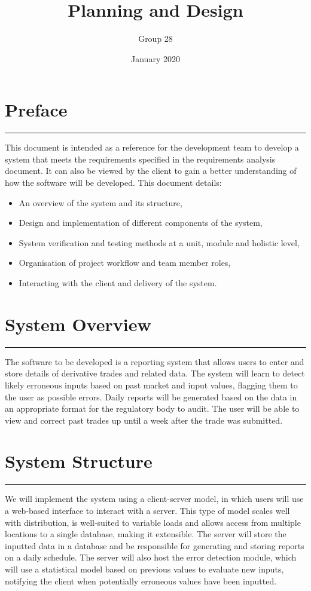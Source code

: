 \documentclass{article}
\title{Planning and Design}
\author{Group 28}
\date{January 2020}
\begin{document}
\maketitle

\section*{Preface}
\hrule
\vspace{9pt}

\noindent This document is intended as a reference for the development team to develop a system that meets the requirements specified in the requirements analysis document.  It can also be viewed by the client to gain a better understanding of how the software will be developed. This document details: 
\begin{itemize}
    \item An overview of the system and its structure,
    \item Design and implementation of different components of the system,
    \item System verification and testing methods at a unit, module and holistic level,
    \item Organisation of project workflow and team member roles,
    \item Interacting with the client and delivery of the system. 
\end{itemize}


\section*{System Overview}
\hrule
\vspace{9pt}
The software to be developed is a reporting system that allows users to enter and store details of derivative trades and related data. The system will learn to detect likely erroneous inputs based on past market and input values, flagging them to the user as possible errors. Daily reports will be generated based on the data in an appropriate format for the regulatory body to audit. The user will be able to view and correct past trades up until a week after the trade was submitted.

\section*{System Structure}
\hrule
\vspace{9pt}
We will implement the system using a client-server model, in which users will use a web-based interface to interact with a server. This type of model scales well with distribution, is well-suited to variable loads and allows access from multiple locations to a single database, making it extensible. The server will store the inputted data in a database and be responsible for generating and storing reports on a daily schedule. The server will also host the error detection module, which will use a statistical model based on previous values to evaluate new inputs, notifying the client when potentially erroneous values have been inputted.
\end{document}
